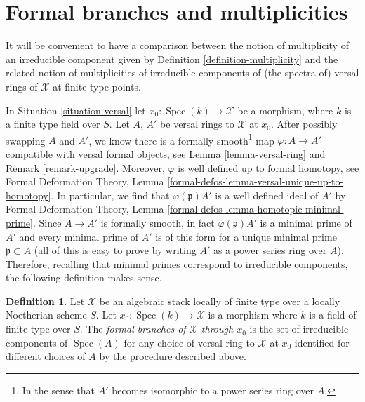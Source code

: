 \documentclass{stacks-project}
\theoremstyle{plain}
\theoremstyle{definition}
\newtheorem{definition}[subsection]{Definition}
\theoremstyle{remark}
\numberwithin{equation}{subsection}
\def\Spec{\mathop{\mathrm{Spec}}}
\begin{document}
\section{Formal branches and multiplicities}
\label{section-formal-branches}

\noindent
It will be convenient to have a comparison between the notion of multiplicity
of an irreducible component given by Definition \ref{definition-multiplicity}
and the related notion of multiplicities of irreducible components of
(the spectra of) versal rings of $\mathcal{X}$ at finite type points.

\medskip\noindent
In Situation \ref{situation-versal} let $x_0 : \Spec(k) \to \mathcal{X}$
be a morphism, where $k$ is a finite type field over $S$.
Let $A$, $A'$ be versal rings to $\mathcal{X}$ at $x_0$.
After possibly swapping $A$ and $A'$, we know there is a
formally smooth\footnote{In the sense that
$A'$ becomes isomorphic to a power series ring over $A$.}
map $\varphi : A \to A'$ compatible with versal formal objects, see
Lemma \ref{lemma-versal-ring} and
Remark \ref{remark-upgrade}.
Moreover, $\varphi$ is well defined up to formal homotopy, see
Formal Deformation Theory, Lemma
\ref{formal-defos-lemma-versal-unique-up-to-homotopy}.
In particular, we find that $\varphi(\mathfrak p)A'$ is a well
defined ideal of $A'$ by
Formal Deformation Theory, Lemma
\ref{formal-defos-lemma-homotopic-minimal-prime}.
Since $A \to A'$ is formally smooth, in fact
$\varphi(\mathfrak p)A'$ is a minimal prime of $A'$
and every minimal prime of $A'$ is of this form for
a unique minimal prime $\mathfrak p \subset A$ (all of this
is easy to prove by writing $A'$ as a power series ring over $A$).
Therefore, recalling that minimal primes correspond
to irreducible components, the following definition makes sense.

\begin{definition}
\label{definition-formal-branches}
Let $\mathcal{X}$ be an algebraic stack locally of finite type
over a locally Noetherian scheme $S$. Let $x_0 : \Spec(k) \to \mathcal{X}$
is a morphism where $k$ is a field of finite type over $S$.
The {\it formal branches of $\mathcal{X}$ through $x_0$}
is the set of irreducible components of $\Spec(A)$
for any choice of versal ring to $\mathcal{X}$ at $x_0$
identified for different choices of $A$ by the procedure described above.
\end{definition}
\end{document}
